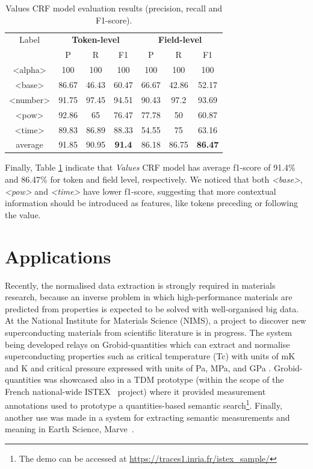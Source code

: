 \documentclass[sigconf]{acmart}
\begin{document}
\begin{table}[ht]
  \caption{Values CRF model evaluation results (precision, recall and F1-score).}
  \label{tab:values-evaluation}
  \begin{tabular}{c|ccc|ccc}
    \toprule
    Label & \multicolumn{3}{c}{\textbf{Token-level}} & \multicolumn{3}{c}{\textbf{Field-level}}\\
    & P & R & F1 & P & R & F1 \\
    \midrule
    <alpha>       & 100   & 100   & 100   & 100   & 100   & 100     \\
    <base>        & 86.67 & 46.43 & 60.47 & 66.67 & 42.86 & 52.17   \\
    <number>      & 91.75 & 97.45 & 94.51 & 90.43 & 97.2  & 93.69   \\
    <pow>         & 92.86 & 65    & 76.47 & 77.78 & 50    & 60.87   \\
    <time>        & 89.83 & 86.89 & 88.33 & 54.55 & 75    & 63.16   \\
    \midrule
    average       & 91.85 & 90.95 & \textbf{91.4} & 86.18 & 86.75 & \textbf{86.47}   \\
    \bottomrule
     \end{tabular}
\end{table}

Finally, Table \ref{tab:values-evaluation} indicate that \textit{Values} CRF model has average f1-score of 91.4\% and 86.47\% for token and field level, respectively. We noticed that both \textit{<base>}, \textit{<pow>} and \textit{<time>} have lower f1-score, suggesting that more contextual information should be introduced as features, like tokens preceding or following the value. 

\section{Applications}
\label{sec:use_cases}
Recently, the normalised data extraction is strongly required in materials research, because an inverse problem in which high-performance materials are predicted from properties is expected to be solved with well-organised big data. At the National Institute for Materials Science (NIMS), a project to discover new superconducting materials from scientific literature is in progress. The system being developed relays on Grobid-quantities which can extract and normalise superconducting properties such as critical temperature (Tc) with units of mK and K and critical pressure expressed with units of Pa, MPa, and GPa \cite{foppiano2019proposal}. Grobid-quantities was showcased also in a TDM prototype (within the scope of the French national-wide ISTEX~\cite{dazy2014istex} project) where it provided measurement annotations used to prototype a quantities-based semantic search\footnote{The demo can be accessed at \url{https://traces1.inria.fr/istex_sample/}}. Finally, another use was made in a system for extracting semantic measurements and meaning in Earth Science, Marve~\cite{hundman2017measurement}.  
\end{document}
